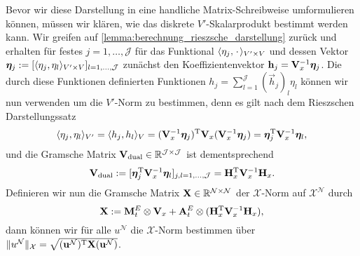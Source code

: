 \documentclass[../main.tex]{subfiles}
\begin{document}
Bevor wir diese Darstellung in eine handliche Matrix-Schreibweise umformulieren können, müssen wir klären, wie das diskrete $V'$-Skalarprodukt bestimmt werden kann.
Wir greifen auf \cref{lemma:berechnung_rieszsche_darstellung} zurück und erhalten für festes $j = 1, \dots, \mathcal J$ für das Funktional $\langle\eta_{j},{\mkern2mu\cdot\mkern2mu}\rangle_{V' \times V}$ und dessen Vektor $\bm \eta_{j} := [\langle\eta_{j},\eta_{l}\rangle_{V' \times V}]_{l = 1, \dots, \mathcal J}$ zunächst den Koeffizientenvektor $\mathbf{h}_{j} = \mathbf{V}_{x}^{-1} \bm \eta_{j}$.
Die durch diese Funktionen definierten Funktionen $h_{j} = \sum_{l = 1}^{\mathcal J} (\vec{h}_{j})_{l} \eta_{l}$ können wir nun verwenden um die $V'$-Norm zu bestimmen, denn es gilt nach dem Rieszschen Darstellungssatz
\begin{equation}
    \langle\eta_{j},\eta_{l}\rangle_{V'} = \langle h_{j},h_{l}\rangle_{V} = (\mathbf{V}_{x}^{-1} \bm \eta_{j})^{\mathrm{T}} \mathbf{V}_{x} (\mathbf{V}_{x}^{-1} \bm \eta_{j}) = \bm{\eta}_{j}^{\mathrm{T}} \mathbf{V}_{x}^{-1} \bm{\eta}_{l},
\end{equation}
und die Gramsche Matrix $\mathbf{V}_{\mathrm{dual}} \in \mathbb{R}^{\mathcal J \times \mathcal J}$ ist dementsprechend
\begin{equation}
    \mathbf{V}_{\mathrm{dual}} := [\bm{\eta}_{j}^{\mathrm{T}} \mathbf{V}_{x}^{-1} \bm{\eta}_{l}]_{j,l = 1, \dots, \mathcal J} = \mathbf{H}_{x}^{\mathrm{T}} \mathbf{V}_{x}^{-1} \mathbf{H}_{x}.
\end{equation}
Definieren wir nun die Gramsche Matrix $\mathbf{X} \in \mathbb{R}^{\mathcal N \times \mathcal N}$ der $\mathcal X$-Norm auf $\mathcal X^{\mathcal N}$ durch
\begin{equation}
    \mathbf{X} := \mathbf{M}^{E}_{t} \otimes \mathbf{V}_{x} + \mathbf{A}^{E}_{t} \otimes (\mathbf{H}_{x}^{\mathrm{T}} \mathbf{V}_{x}^{-1} \mathbf{H}_{x}),
\end{equation}
dann können wir für alle $u^{\mathcal N}$ die $\mathcal X$-Norm bestimmen über $\lVert u^{\mathcal N}\rVert_{\mathcal X} = \sqrt{(\mathbf{u}^{\mathcal N})^{\mathrm{T}} \mathbf{X} (\mathbf{u}^{\mathcal N})}$.
\end{document}
